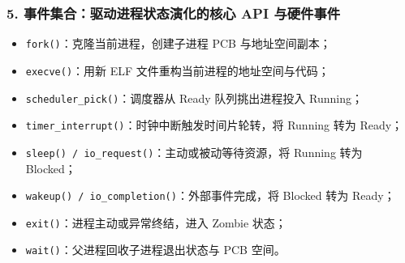 \documentclass[11pt,a4paper,openany]{ctexbook}
\begin{document}
\subsubsection*{5. 事件集合：驱动进程状态演化的核心 API 与硬件事件}
\begin{itemize}
  \item \texttt{fork()}：克隆当前进程，创建子进程 PCB 与地址空间副本；
  \item \texttt{execve()}：用新 ELF 文件重构当前进程的地址空间与代码；
  \item \texttt{scheduler\_pick()}：调度器从 Ready 队列挑出进程投入 Running；
  \item \texttt{timer\_interrupt()}：时钟中断触发时间片轮转，将 Running 转为 Ready；
  \item \texttt{sleep() / io\_request()}：主动或被动等待资源，将 Running 转为 Blocked；
  \item \texttt{wakeup() / io\_completion()}：外部事件完成，将 Blocked 转为 Ready；
  \item \texttt{exit()}：进程主动或异常终结，进入 Zombie 状态；
  \item \texttt{wait()}：父进程回收子进程退出状态与 PCB 空间。
\end{itemize}
\end{document}
